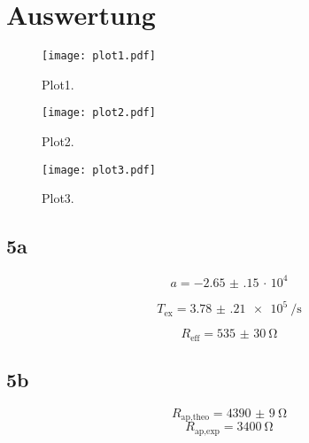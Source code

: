 \section{Auswertung}
\label{sec:Auswertung}

\begin{figure}
  \centering
  \texttt{[image: plot1.pdf]}
  \caption{Plot1.}
  \label{fig:plot1}
\end{figure}

\begin{figure}
  \centering
  \texttt{[image: plot2.pdf]}
  \caption{Plot2.}
  \label{fig:plot2}
\end{figure}

\begin{figure}
  \centering
  \texttt{[image: plot3.pdf]}
  \caption{Plot3.}
  \label{fig:plot3}
\end{figure}

\subsection{5a}
\begin{equation}
   a = \num{-2.65(15)}\, \cdot\, 10^{4}
\end{equation}

\begin{equation}
   T_{\text{ex}} = \SI{3.78(21)e5}{\per\second}
\end{equation}

\begin{equation}
R_{\text{eff}} = \SI{535(30)}{\ohm}
\end{equation}


\subsection{5b}

\begin{equation}
  R_{\text{ap,theo}} = \SI{4390(9)}{\ohm}
  \end{equation}
\begin{equation}
  R_{\text{ap,exp}} = \SI{3400}{\ohm}
\end{equation}
